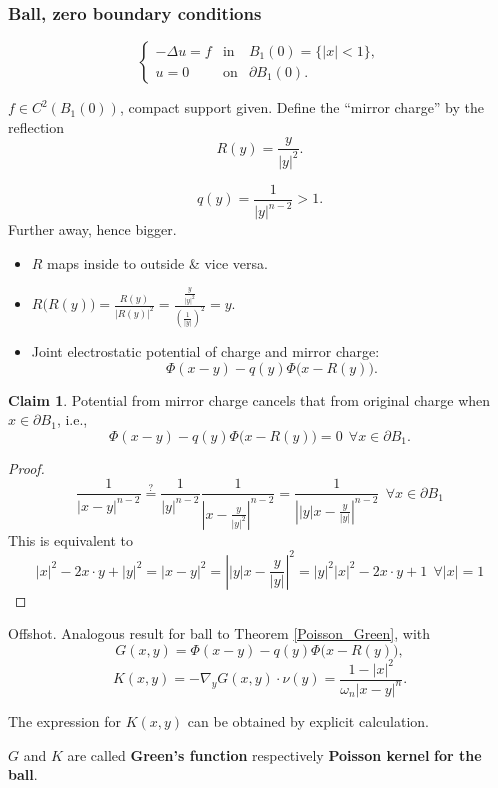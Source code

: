 \documentclass[12pt]{article}
\theoremstyle{definition}
\newtheorem*{claim*}{Claim}
\begin{document}
\subsubsection{Ball, zero boundary conditions}
\[\left\{\begin{array}{ccl}-\Delta u=f&\text{in}&B_1(0)=\{|x|<1\},\\u=0&\text{on}&\partial B_1(0).\end{array}\right.\]

$f\in C^2(B_1(0))$, compact support given. Define the ``mirror charge'' by the reflection
\[R(y)=\frac{y}{|y|^2}.\]

\[q(y)=\frac{1}{|y|^{n-2}}>1.\]
Further away, hence bigger.

\begin{itemize}
\item $R$ maps inside to outside \& vice versa.

\item $\displaystyle{R\big(R(y)\big)=\frac{R(y)}{\big|R(y)\big|^2}=\frac{\frac{y}{|y|^2}}{\left(\frac{1}{|y|}\right)^2}=y}$.

\item Joint electrostatic potential of charge and mirror charge:
\[\Phi(x-y)-q(y)\Phi\big(x-R(y)\big).\]
\end{itemize}

\begin{claim*}
Potential from mirror charge cancels that from original charge when $x\in\partial B_1$, i.e.,
\[\Phi(x-y)-q(y)\Phi\big(x-R(y)\big)=0\ \ \forall x\in\partial B_1.\]
\end{claim*}

\begin{proof}
\[\frac{1}{|x-y|^{n-2}}\overset{?}{=}\frac{1}{|y|^{n-2}}\frac{1}{\left|x-\frac{y}{|y|^2}\right|^{n-2}}=\frac{1}{\left||y|x-\frac{y}{|y|}\right|^{n-2}}\ \ \forall x\in\partial B_1\]
This is equivalent to
\[|x|^2-2x\cdot y+|y|^2=|x-y|^2=\left||y|x-\frac{y}{|y|}\right|^2=|y|^2|x|^2-2x\cdot y+1\ \ \forall|x|=1\]
\end{proof}
Offshot. Analogous result for ball to Theorem \ref{Poisson_Green}, with
\[G(x,y)=\Phi(x-y)-q(y)\Phi\big(x-R(y)\big),\]
\[K(x,y)=-\nabla_yG(x,y)\cdot\nu(y)=\frac{1-|x|^2}{\omega_n|x-y|^n}.\]

The expression for $K(x,y)$ can be obtained by explicit calculation.

$G$ and $K$ are called \textbf{Green's function} respectively \textbf{Poisson kernel} \textbf{for the ball}.

\end{document}
